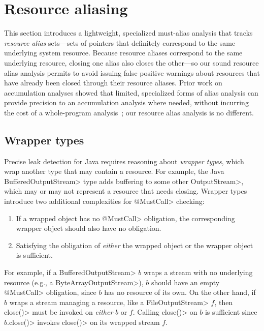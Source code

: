 \section{Resource aliasing}
\label{sec:must-call-choice}

This section introduces a lightweight, specialized must-alias analysis
that tracks \emph{resource alias} sets---sets of pointers that
definitely correspond to the same underlying system resource.  Because
resource aliases correspond to the same underlying resource, closing
one alias also closes the other---so our sound resource alias analysis
permits \tool to avoid issuing false positive warnings about resources
that have already been closed through their resource aliases.  Prior
work on accumulation analyses showed that limited, specialized forms
of alias analysis can provide precision to an accumulation analysis
where needed, without incurring the cost of a whole-program
analysis~\cite{KelloggRSSE2020}; our resource alias analysis is no
different.

\subsection{Wrapper types}

Precise leak detection for Java requires reasoning about \emph{wrapper types},
which wrap another type that may contain a resource.  For example, the Java
\<BufferedOutputStream> type adds buffering to some other \<OutputStream>, which
may or may not represent a resource that needs closing.  Wrapper types
introduce two additional complexities for \<@MustCall> checking:
\begin{enumerate}
  \item If a wrapped object has no \<@MustCall> obligation, the corresponding
  wrapper object should also have no obligation.
  \item Satisfying the obligation of \emph{either} the wrapped object or the
  wrapper object is sufficient.
\end{enumerate}
For example, if a \<BufferedOutputStream> $b$ wraps a stream with no underlying
resource (e.g., a \<ByteArrayOutputStream>), $b$ should have an empty
\<@MustCall> obligation, since $b$ has no resource of its own.  On the other
hand, if $b$ wraps a stream managing a resource, like a \<FileOutputStream> $f$,
then \<close()> must be invoked on \emph{either} $b$ or $f$. Calling \<close()> on $b$
is sufficient since $b$\<.close()> invokes \<close()> on its wrapped stream $f$.

